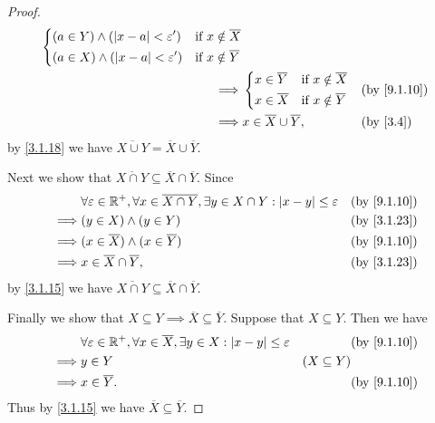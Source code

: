 \begin{proof}
\begin{align*}
\begin{dcases}
                 (a \in Y) \land (\abs{x - a} < \varepsilon') & \text{if } x \notin \overline{X} \\
                 (a \in X) \land (\abs{x - a} < \varepsilon') & \text{if } x \notin \overline{Y}
               \end{dcases}                                                                    \\
    \implies & \begin{dcases}
                 x \in \overline{Y} & \text{if } x \notin \overline{X} \\
                 x \in \overline{X} & \text{if } x \notin \overline{Y}
               \end{dcases}                                                               &  & \by{9.1.10}                                                        \\
    \implies & x \in \overline{X} \cup \overline{Y},                                                                                  &  & \text{(by \cref{3.4})}
  \end{align*}
  by \cref{3.1.18} we have \(\overline{X \cup Y} = \overline{X} \cup \overline{Y}\).

  Next we show that \(\overline{X \cap Y} \subseteq \overline{X} \cap \overline{Y}\).
  Since
  \begin{align*}
             & \forall \varepsilon \in \R^+, \forall x \in \overline{X \cap Y}, \exists y \in X \cap Y : \abs{x - y} \leq \varepsilon &  & \by{9.1.10} \\
    \implies & (y \in X) \land (y \in Y)                                                                                              &  & \by{3.1.23} \\
    \implies & (x \in \overline{X}) \land (x \in \overline{Y})                                                                        &  & \by{9.1.10} \\
    \implies & x \in \overline{X} \cap \overline{Y},                                                                                  &  & \by{3.1.23}
  \end{align*}
  by \cref{3.1.15} we have \(\overline{X \cap Y} \subseteq \overline{X} \cap \overline{Y}\).

  Finally we show that \(X \subseteq Y \implies \overline{X} \subseteq \overline{Y}\).
  Suppose that \(X \subseteq Y\).
  Then we have
  \begin{align*}
             & \forall \varepsilon \in \R^+, \forall x \in \overline{X}, \exists y \in X : \abs{x - y} \leq \varepsilon &                 & \by{9.1.10} \\
    \implies & y \in Y                                                                                                  & (X \subseteq Y)               \\
    \implies & x \in \overline{Y}.                                                                                      &                 & \by{9.1.10}
  \end{align*}
  Thus by \cref{3.1.15} we have \(\overline{X} \subseteq \overline{Y}\).
\end{proof}

